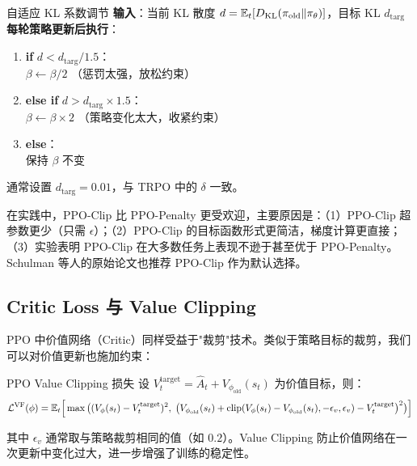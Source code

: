 \begin{myalgorithm}{自适应 KL 系数调节}
\textbf{输入}：当前 KL 散度 $d = \mathbb{E}_t[D_{\text{KL}}(\pi_{\text{old}} \| \pi_\theta)]$，目标 KL $d_{\text{targ}}$\\
\textbf{每轮策略更新后执行}：
\begin{enumerate}
    \item \textbf{if} $d < d_{\text{targ}} / 1.5$：\\
    \quad $\beta \leftarrow \beta / 2$ \quad（惩罚太强，放松约束）
    \item \textbf{else if} $d > d_{\text{targ}} \times 1.5$：\\
    \quad $\beta \leftarrow \beta \times 2$ \quad（策略变化太大，收紧约束）
    \item \textbf{else}：\\
    \quad 保持 $\beta$ 不变
\end{enumerate}
\end{myalgorithm}

通常设置 $d_{\text{targ}} = 0.01$，与 TRPO 中的 $\delta$ 一致。

\begin{remark}
在实践中，PPO-Clip 比 PPO-Penalty 更受欢迎，主要原因是：（1）PPO-Clip 超参数更少（只需 $\epsilon$）；（2）PPO-Clip 的目标函数形式更简洁，梯度计算更直接；（3）实验表明 PPO-Clip 在大多数任务上表现不逊于甚至优于 PPO-Penalty。Schulman 等人的原始论文也推荐 PPO-Clip 作为默认选择。
\end{remark}

\subsection{Critic Loss 与 Value Clipping}

PPO 中价值网络（Critic）同样受益于"裁剪"技术。类似于策略目标的裁剪，我们可以对价值更新也施加约束：

\begin{mydefinition}{PPO Value Clipping 损失}
设 $V^{\text{target}}_t = \hat{A}_t + V_{\phi_{\text{old}}}(s_t)$ 为价值目标，则：
\[
\mathcal{L}^{\text{VF}}(\phi) = \mathbb{E}_t \Big[ \max\big(
    (V_\phi(s_t) - V^{\text{target}}_t)^2,\;
    \big( V_{\phi_{\text{old}}}(s_t) + \operatorname{clip}(V_\phi(s_t) - V_{\phi_{\text{old}}}(s_t), -\epsilon_v, \epsilon_v) - V^{\text{target}}_t \big)^2
\big) \Big]
\]
\end{mydefinition}

其中 $\epsilon_v$ 通常取与策略裁剪相同的值（如 $0.2$）。Value Clipping 防止价值网络在一次更新中变化过大，进一步增强了训练的稳定性。


